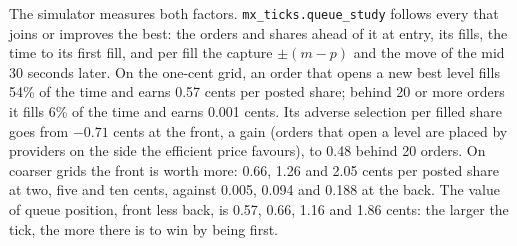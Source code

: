 The simulator measures both factors. \texttt{mx\_ticks.queue\_study} follows every  that joins or improves the best: the orders and shares ahead
of it at entry, its fills, the time to its first fill, and per fill the capture $\pm(m-p)$ and the move of the mid 30 seconds later. On the one-cent grid,
an order that opens a new best level fills 54\% of the time and earns 0.57 cents per posted share; behind 20 or more orders it fills 6\% of the time and
earns 0.001 cents. Its adverse selection per filled share goes from $-0.71$ cents at the front, a gain (orders that open a level are placed by providers on
the side the efficient price favours), to 0.48 behind 20 orders. On coarser grids the front is worth more: 0.66, 1.26 and 2.05 cents per posted share at
two, five and ten cents, against 0.005, 0.094 and 0.188 at the back. The value of queue position, front less back, is 0.57, 0.66, 1.16 and 1.86 cents:
the larger the tick, the more there is to win by being first.

